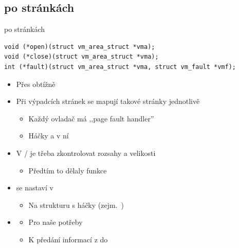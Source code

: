 \subsection{ po stránkách}
\fi

\begin{frame}[fragile]{ po stránkách}

  \begin{block}{}
    \begin{lstlisting}[aboveskip=2pt,belowskip=2pt]
void (*open)(struct vm_area_struct *vma);
void (*close)(struct vm_area_struct *vma);
int (*fault)(struct vm_area_struct *vma, struct vm_fault *vmf);
    \end{lstlisting}
  \end{block}

  \begin{itemize}
    \item Přes  obtížně
    \item Při výpadcích stránek se mapují takové stránky jednotlivě
    \begin{itemize}
      \item Každý ovladač má ,,page fault handler''
      \item Háčky  a v ní 
    \end{itemize}

    \pause

    \item V / je třeba zkontrolovat rozsahy a velikosti
    \begin{itemize}
      \item Předtím to dělaly  funkce
    \end{itemize}

    \pause

    \item {} se nastaví v 
    \begin{itemize}
      \item Na strukturu s háčky (zejm.\ )
    \end{itemize}

    \pause

    \item {}
    \begin{itemize}
      \item Pro naše potřeby
      \item K předání informací z  do
    \end{itemize}
  \end{itemize}

\end{frame}

